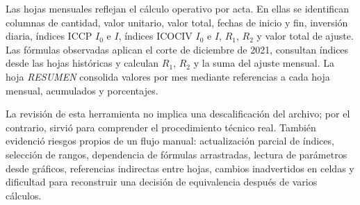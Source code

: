 \documentclass[12pt,letterpaper]{article}
\newcommand{\ICOCIV}{ICOCIV}
\newcommand{\ICCP}{ICCP}
\begin{document}
Las hojas mensuales reflejan el cálculo operativo por acta. En ellas se identifican columnas de cantidad, valor unitario, valor total, fechas de inicio y fin, inversión diaria, índices \ICCP{} \(I_0\) e \(I\), índices \ICOCIV{} \(I_0\) e \(I\), \(R_1\), \(R_2\) y valor total de ajuste. Las fórmulas observadas aplican el corte de diciembre de 2021, consultan índices desde las hojas históricas y calculan \(R_1\), \(R_2\) y la suma del ajuste mensual. La hoja \textit{RESUMEN} consolida valores por mes mediante referencias a cada hoja mensual, acumulados y porcentajes.

La revisión de esta herramienta no implica una descalificación del archivo; por el contrario, sirvió para comprender el procedimiento técnico real. También evidenció riesgos propios de un flujo manual: actualización parcial de índices, selección de rangos, dependencia de fórmulas arrastradas, lectura de parámetros desde gráficos, referencias indirectas entre hojas, cambios inadvertidos en celdas y dificultad para reconstruir una decisión de equivalencia después de varios cálculos.
\end{document}

